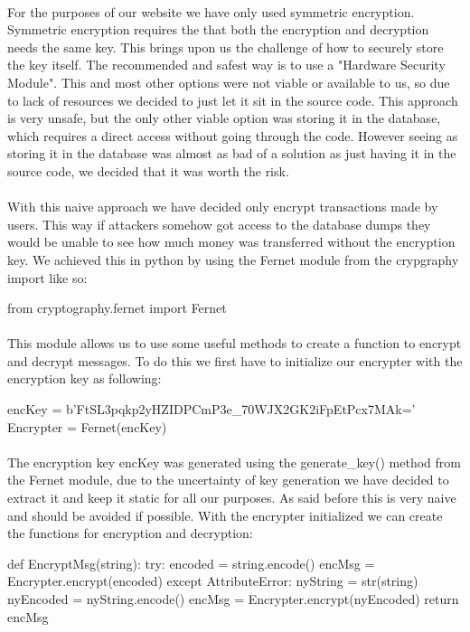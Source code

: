 \paragraph{}

For the purposes of our website we have only used symmetric encryption. Symmetric encryption requires the that both the encryption and decryption needs the same key. This brings upon us the challenge of how to securely store the key itself. The recommended and safest way is to use a "Hardware Security Module". This and most other options were not viable or available to us, so due to lack of resources we decided to just let it sit in the source code. This approach is very unsafe, but the only other viable option was storing it in the database, which requires a direct access without going through the code. However seeing as storing it in the database was almost as bad of a solution as just having it in the source code, we decided that it was worth the risk. 
\paragraph{}
With this naive approach we have decided only encrypt transactions made by users. This way if attackers somehow got access to the database dumps they would be unable to see how much money was transferred without the encryption key. We achieved this in python by using the Fernet module from the crypgraphy import like so:
\begin{python}[language=Python]
from cryptography.fernet import Fernet
\end{python}
\paragraph{}
This module allows us to use some useful methods to create a function to encrypt and decrypt messages. To do this we first have to initialize our encrypter with the encryption key as following:
\begin{python}
encKey = b'FtSL3pqkp2yHZIDPCmP3e_70WJX2GK2iFpEtPcx7MAk='
Encrypter = Fernet(encKey)
\end{python}
\paragraph{}
The encryption key encKey was generated using the generate\_key() method from the Fernet module, due to the uncertainty of key generation we have decided to extract it and keep it static for all our purposes. As said before this is very naive and should be avoided if possible. With the encrypter initialized we can create the functions for encryption and decryption:
\begin{python}
def EncryptMsg(string):
try:
    encoded = string.encode()
    encMsg = Encrypter.encrypt(encoded)
except AttributeError:
    nyString = str(string)
    nyEncoded = nyString.encode()
    encMsg = Encrypter.encrypt(nyEncoded)
return encMsg
\end{python}
